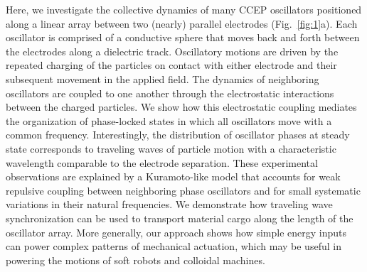 Here, we investigate the collective dynamics of many CCEP oscillators positioned along a linear array between two (nearly) parallel electrodes (Fig.~\ref{fig:1}a). Each oscillator is comprised of a conductive sphere that moves back and forth between the electrodes along a dielectric track.  Oscillatory motions are driven by the repeated charging of the particles on contact with either electrode and their subsequent movement in the applied field. The dynamics of neighboring oscillators are coupled to one another through the electrostatic interactions between the charged particles. We show how this electrostatic coupling mediates the organization of phase-locked states in which all oscillators move with a common frequency. Interestingly, the distribution of oscillator phases at steady state corresponds to traveling waves of particle motion with a characteristic wavelength comparable to the electrode separation. These experimental observations are explained by a Kuramoto-like model\autocite{Acebron2005,Tsimring2005} that accounts for weak repulsive coupling between neighboring phase oscillators and for small systematic variations in their natural frequencies. We demonstrate how traveling wave synchronization can be used to transport material cargo along the length of the oscillator array. More generally, our approach shows how simple energy inputs can power complex patterns of mechanical actuation, which may be useful in powering the motions of soft robots\autocite{rus2015design, acome2018hydraulically} and colloidal machines\autocite{Snezhko2011,Yan2012, Martinez-Pedrero2015, goodrich2017using, Driscoll2017}.

